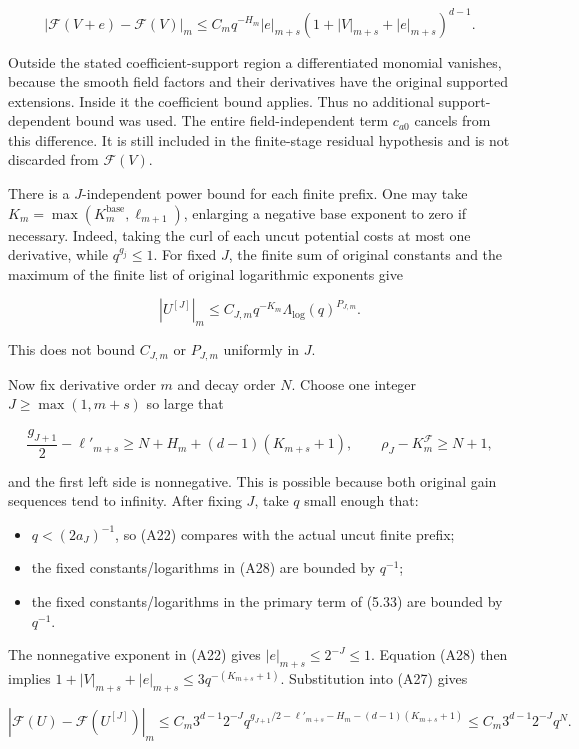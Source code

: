 \documentclass[10pt,a4paper]{article}
\providecommand{\tightlist}{\setlength{\itemsep}{0pt}\setlength{\parskip}{0pt}}
\begin{document}
\[
|\mathcal F(V+e)-\mathcal F(V)|_m
\le C_mq^{-H_m}|e|_{m+s}
       (1+|V|_{m+s}+|e|_{m+s})^{d-1}.
\tag{A27}
\]

Outside the stated coefficient-support region a differentiated monomial vanishes, because the smooth field factors and their derivatives have the original supported extensions. Inside it the coefficient bound applies. Thus no additional support-dependent bound was used. The entire field-independent term \(c_{a0}\) cancels from this difference. It is still included in the finite-stage residual hypothesis and is not discarded from \(\mathcal F(V)\).

There is a \(J\)-independent power bound for each finite prefix. One may take \(K_m=\max(K_m^{\mathrm{base}},\ell_{m+1})\), enlarging a negative base exponent to zero if necessary. Indeed, taking the curl of each uncut potential costs at most one derivative, while \(q^{g_j}\le1\). For fixed \(J\), the finite sum of original constants and the maximum of the finite list of original logarithmic exponents give

\[
|U^{[J]}|_m\le C_{J,m}q^{-K_m}\Lambda_{\log}(q)^{P_{J,m}}.
\tag{A28}
\]

This does not bound \(C_{J,m}\) or \(P_{J,m}\) uniformly in \(J\).

Now fix derivative order \(m\) and decay order \(N\). Choose one integer \(J\ge\max(1,m+s)\) so large that

\[
\frac{g_{J+1}}2-\ell'_{m+s}
\ge N+H_m+(d-1)(K_{m+s}+1),
\qquad
\rho_J-K_m^{\mathcal F}\ge N+1,
\tag{A29}
\]

and the first left side is nonnegative. This is possible because both original gain sequences tend to infinity. After fixing \(J\), take \(q\) small enough that:

\begin{itemize}
\tightlist
\item
  \(q<(2a_J)^{-1}\), so (A22) compares with the actual uncut finite prefix;
\item
  the fixed constants/logarithms in (A28) are bounded by \(q^{-1}\);
\item
  the fixed constants/logarithms in the primary term of (5.33) are bounded by \(q^{-1}\).
\end{itemize}

The nonnegative exponent in (A22) gives \(|e|_{m+s}\le2^{-J}\le1\). Equation (A28) then implies \(1+|V|_{m+s}+|e|_{m+s}\le3q^{-(K_{m+s}+1)}\). Substitution into (A27) gives

\[
|\mathcal F(U)-\mathcal F(U^{[J]})|_m
\le C_m3^{d-1}2^{-J}
 q^{g_{J+1}/2-\ell'_{m+s}-H_m-(d-1)(K_{m+s}+1)}
\le C_m3^{d-1}2^{-J}q^N.
\tag{A30}
\]
\end{document}
